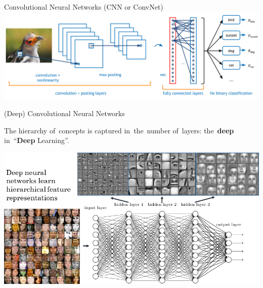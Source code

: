 \documentclass{beamer}
\begin{document}
  {
    \begin{frame}{Convolutional Neural Networks (CNN or ConvNet)}
      \includegraphics[width=\linewidth,height=\textheight,keepaspectratio]{../img/CNN_bird_detection.png}
    \end{frame}
  }

  {
    \begin{frame}{(Deep) Convolutional Neural Networks}
      \begin{center}
        \tiny
        The hierarchy of~concepts is captured in~the~number of~layers: the~\textbf{deep} in~``\textbf{Deep} Learning''.
        \pause

        \includegraphics[width=\textwidth]{../img/ConvNet_hierarchy.png}
      \end{center}
    \end{frame}
  }

\end{document}
